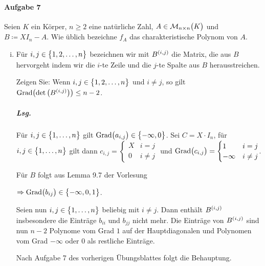 \documentclass{scrreprt}
\newcommand{\Grad}{\text{Grad}}
\begin{document}
\paragraph{Aufgabe 7} Seien $K$ ein Körper, $n \geq 2$ eine natürliche Zahl,
$A \in \mathcal{M}_{n \times n}\qty\big(K)$ und $B \coloneqq XI_n - A$.
Wie üblich bezeichne $f_A$ das charakteristische Polynom von $A$.
\begin{enumerate}[(i)]
\item Für $i, j \in \qty\big{1, 2, \ldots, n}$ bezeichnen wir mit
  $B^{\qty(i, j)}$ die Matrix, die aus $B$ hervorgeht indem wir die $i$-te
  Zeile und die $j$-te Spalte aus $B$ herausstreichen.

  Zeigen Sie: Wenn $i, j \in \qty\big{1, 2, \ldots, n}$ und $i \ne j$, so gilt
  $\Grad\qty\big(\det\qty\big(B^{(i, j)})) \leq n - 2$.

  \subparagraph{Lsg.} Für $i, j \in \qty\big{1, \ldots, n}$ gilt
  $\Grad\qty\big(a_{i, j}) \in \qty\big{-\infty, 0}$.
  Sei $C = X \cdot I_n$, für $i, j \in \qty\big{1, \ldots, n}$ gilt dann
  $c_{i, j} = \begin{cases}
    X & i = j \\
    0 & i \ne j
  \end{cases}$ und $\Grad\qty\big(c_{i, j}) = \begin{cases}
    1 & i = j \\
    -\infty & i \ne j
  \end{cases}$.

  Für $B$ folgt aus Lemma 9.7 der Vorlesung
  $\Rightarrow \Grad\qty\big(b_{ij}) \in \qty\big{-\infty, 0, 1}$.

  Seien nun $i, j \in \qty\big{1, \ldots, n}$ beliebig mit $i \ne j$.
  Dann enthält $B^{\qty(i, j)}$ insbesondere die Einträge $b_{ii}$ und
  $b_{jj}$ nicht mehr.
  Die Einträge von $B^{\qty(i, j)}$ sind nun $n - 2$ Polynome vom Grad $1$ auf
  der Hauptdiagonalen und Polynomen vom Grad $-\infty$ oder $0$ als restliche
  Einträge.

  Nach Aufgabe 7 des vorherigen Übungsblattes folgt die Behauptung.
\end{enumerate}
\newpage
\end{document}

